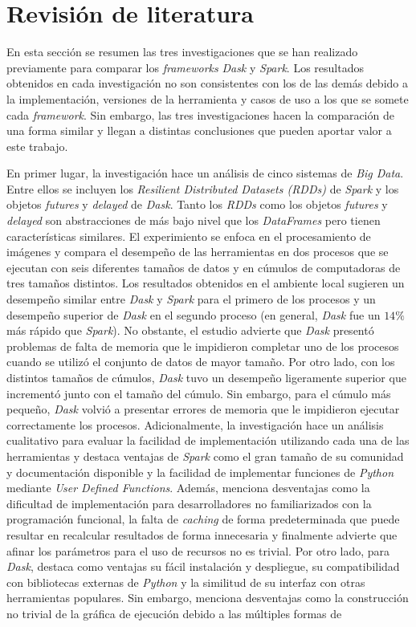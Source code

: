 \chapter{Revisión de literatura}

\noindent En esta sección se resumen las tres investigaciones que se han realizado previamente para comparar los \textit{frameworks} \textit{Dask} y \textit{Spark}. Los resultados obtenidos en cada investigación no son consistentes con los de las demás debido a la implementación, versiones de la herramienta y casos de uso a los que se somete cada \textit{framework}. Sin embargo, las tres investigaciones hacen la comparación de una forma similar y llegan a distintas conclusiones que pueden aportar valor a este trabajo.

En primer lugar, la investigación \cite{comparative-evolution} hace un análisis de cinco sistemas de \textit{Big Data}. Entre ellos se incluyen los \textit{Resilient Distributed Datasets (RDDs)} de \textit{Spark} y los objetos \textit{futures} y \textit{delayed} de \textit{Dask}. Tanto los \textit{RDDs} como los objetos \textit{futures} y \textit{delayed} son abstracciones de más bajo nivel que los \textit{DataFrames} pero tienen características similares. El experimiento se enfoca en el procesamiento de imágenes y compara el desempeño de las herramientas en dos procesos que se ejecutan con seis diferentes tamaños de datos y en cúmulos de computadoras de tres tamaños distintos. Los resultados obtenidos en el ambiente local sugieren un desempeño similar entre \textit{Dask} y \textit{Spark} para el primero de los procesos y un desempeño superior de \textit{Dask} en el segundo proceso (en general, \textit{Dask} fue un $14\%$ más rápido que \textit{Spark}). No obstante, el estudio advierte que \textit{Dask} presentó problemas de falta de memoria que le impidieron completar uno de los procesos cuando se utilizó el conjunto de datos de mayor tamaño. Por otro lado, con los distintos tamaños de cúmulos, \textit{Dask} tuvo un desempeño ligeramente superior que incrementó junto con el tamaño del cúmulo. Sin embargo, para el cúmulo más pequeño, \textit{Dask} volvió a presentar errores de memoria que le impidieron ejecutar correctamente los procesos. Adicionalmente, la investigación hace un análisis cualitativo para evaluar la facilidad de implementación utilizando cada una de las herramientas y destaca ventajas de \textit{Spark} como el gran tamaño de su comunidad y documentación disponible y la facilidad de implementar funciones de \textit{Python} mediante \textit{User Defined Functions}. Además, menciona desventajas como la dificultad de implementación para desarrolladores no familiarizados con la programación funcional, la falta de \textit{caching} de forma predeterminada que puede resultar en recalcular resultados de forma innecesaria y finalmente advierte que afinar los parámetros para el uso de recursos no es trivial. Por otro lado, para \textit{Dask}, destaca como ventajas su fácil instalación y despliegue, su compatibilidad con bibliotecas externas de \textit{Python} y la similitud de su interfaz con otras herramientas populares. Sin embargo, menciona desventajas como la construcción no trivial de la gráfica de ejecución debido a las múltiples formas de 
